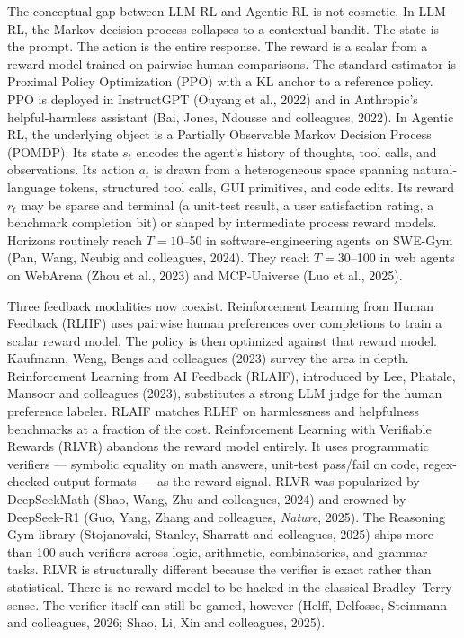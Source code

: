 The conceptual gap between LLM-RL and Agentic RL is not cosmetic. In LLM-RL, the Markov decision process collapses to a contextual bandit. The state is the prompt. The action is the entire response. The reward is a scalar from a reward model trained on pairwise human comparisons. The standard estimator is Proximal Policy Optimization (PPO) with a KL anchor to a reference policy. PPO is deployed in InstructGPT (Ouyang et al., 2022) and in Anthropic's helpful-harmless assistant (Bai, Jones, Ndousse and colleagues, 2022). In Agentic RL, the underlying object is a Partially Observable Markov Decision Process (POMDP). Its state \(s_t\) encodes the agent's history of thoughts, tool calls, and observations. Its action \(a_t\) is drawn from a heterogeneous space spanning natural-language tokens, structured tool calls, GUI primitives, and code edits. Its reward \(r_t\) may be sparse and terminal (a unit-test result, a user satisfaction rating, a benchmark completion bit) or shaped by intermediate process reward models. Horizons routinely reach \(T = 10\)--50 in software-engineering agents on SWE-Gym (Pan, Wang, Neubig and colleagues, 2024). They reach \(T = 30\)--100 in web agents on WebArena (Zhou et al., 2023) and MCP-Universe (Luo et al., 2025).

Three feedback modalities now coexist. Reinforcement Learning from Human Feedback (RLHF) uses pairwise human preferences over completions to train a scalar reward model. The policy is then optimized against that reward model. Kaufmann, Weng, Bengs and colleagues (2023) survey the area in depth. Reinforcement Learning from AI Feedback (RLAIF), introduced by Lee, Phatale, Mansoor and colleagues (2023), substitutes a strong LLM judge for the human preference labeler. RLAIF matches RLHF on harmlessness and helpfulness benchmarks at a fraction of the cost. Reinforcement Learning with Verifiable Rewards (RLVR) abandons the reward model entirely. It uses programmatic verifiers --- symbolic equality on math answers, unit-test pass/fail on code, regex-checked output formats --- as the reward signal. RLVR was popularized by DeepSeekMath (Shao, Wang, Zhu and colleagues, 2024) and crowned by DeepSeek-R1 (Guo, Yang, Zhang and colleagues, \emph{Nature}, 2025). The Reasoning Gym library (Stojanovski, Stanley, Sharratt and colleagues, 2025) ships more than 100 such verifiers across logic, arithmetic, combinatorics, and grammar tasks. RLVR is structurally different because the verifier is exact rather than statistical. There is no reward model to be hacked in the classical Bradley--Terry sense. The verifier itself can still be gamed, however (Helff, Delfosse, Steinmann and colleagues, 2026; Shao, Li, Xin and colleagues, 2025).

